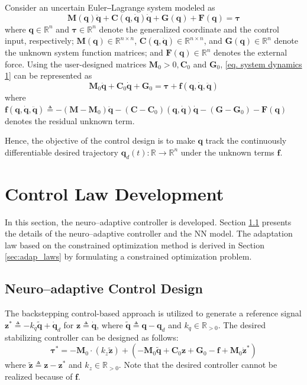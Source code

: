 \documentclass[letterpaper, 10 pt, conference]{ieeeconf}  %
\newcommand\R{\mathbb{R}}
\newcommand*{\mv}[1]{\boldsymbol{#1}}
\newcommand*{\mm}[1]{\boldsymbol{#1}}
\begin{document}
Consider an uncertain Euler‒Lagrange system modeled as
\begin{equation}
    \mm M(\mv q)\ddot {\mv q} + \mm C(\mv q,\dot {\mv q})\dot {\mv q} + \mm G(\mv q) + \mm F(\mv q) = \mv \tau
    \label{eq. system dynamics 1}
\end{equation}
where $\mv q\in \mathbb{R}^n$ and $\mv \tau\in\R^n$ denote the generalized coordinate and the control input, respectively; $\mm M(\mv q)\in\mathbb{R}^{n\times n}$, $\mm C(\mv q,\dot {\mv q})\in\mathbb{R}^{n\times n}$, and $\mm G(\mv q)\in\mathbb{R}^{n}$ denote the unknown system function matrices; and $\mm F(\mv q)\in\mathbb{R}^{n}$ denotes the external force.
Using the user-designed matrices $\mm M_0>0,\mm C_0$ and $\mm G_0$, \eqref{eq. system dynamics 1} can be represented as 
\begin{equation}
    \mm M_0\ddot {\mv q}+\mm C_0\dot {\mv q}+\mm G_0 = \mv \tau + \mv f(\mv q,\dot {\mv q},\ddot {\mv q})
    \label{eq. system dynamics 2}
\end{equation}
where $\mv f(\mv q,\dot {\mv q},\ddot {\mv q}) \triangleq -(\mm M-\mm M_0)\ddot {\mv q}-(\mm C-\mm C_0)(\mv q,\dot {\mv q})\dot {\mv q} -(\mm G-\mm G_0) -\mm F(\mv q)$ denotes the residual unknown term.

Hence, the objective of the control design is to make $\mv q$ track the continuously differentiable desired trajectory $\mv q_d(t):\R\to \R^n$ under the unknown terms $\mv f$.

\section{Control Law Development}\label{sec:ctrl design}

In this section, the neuro–adaptive controller is developed.
Section \ref{sec:ctrl dev} presents the details of the neuro–adaptive controller and the NN model.
The adaptation law based on the constrained optimization method is derived in Section \ref{sec:adap_laws} by formulating a constrained optimization problem.

\subsection{Neuro–adaptive Control Design} \label{sec:ctrl dev}

The backstepping control-based approach is utilized to generate a reference signal $\mv z^*\triangleq -{k_q}\tilde {\mv q}+\dot {\mv q}_d$ for $\mv {z}\triangleq \dot {\mv q}$, where $\tilde {\mv q}\triangleq \mv {q} - {\mv q}_d$ and $k_q\in\R_{>0}$.
The desired stabilizing controller can be designed as follows:
\begin{equation}
    \mv \tau^* = 
    -\mm M_0\cdot ({k_z}\tilde {\mv z})
    + 
        ( 
            -\mm M_0\tilde {\mv q}+\mm C_0{\mv z}+\mm G_0-\mv f+\mm M_0 \dot {\mv z}^*
        )
    \label{eq. desired control}
\end{equation}
where $\tilde {\mv z}\triangleq \mv z-\mv z^*$ and $k_z\in\R_{>0}$.
Note that the desired controller cannot be realized because of $\mv f$.
\end{document}
